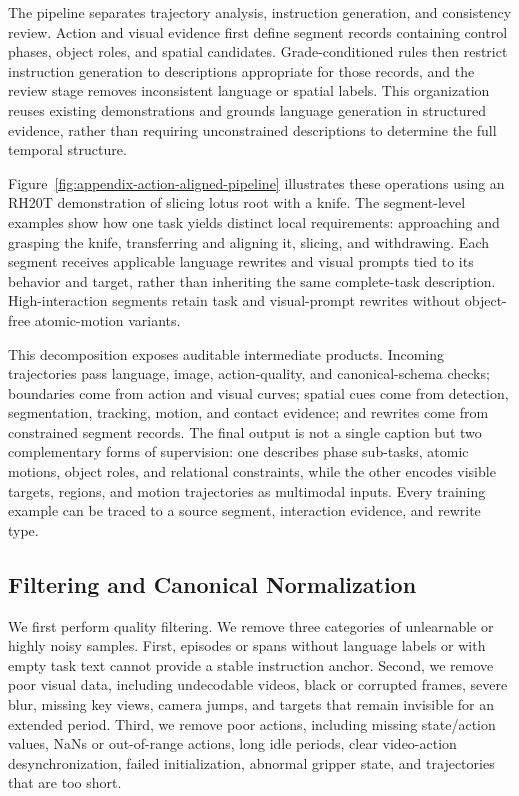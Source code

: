 The pipeline separates trajectory analysis, instruction generation, and consistency review. Action
and visual evidence first define segment records containing control phases, object roles, and
spatial candidates. Grade-conditioned rules then restrict instruction generation to descriptions
appropriate for those records, and the review stage removes inconsistent language or spatial labels.
This organization reuses existing demonstrations and grounds language generation in structured
evidence, rather than requiring unconstrained descriptions to determine the full temporal structure.

Figure~\ref{fig:appendix-action-aligned-pipeline} illustrates these operations
using an RH20T demonstration of slicing lotus root with a knife. The
segment-level examples show how one task yields distinct local requirements:
approaching and grasping the knife, transferring and aligning it, slicing,
and withdrawing. Each segment receives applicable language rewrites and
visual prompts tied to its behavior and target, rather than inheriting the
same complete-task description. High-interaction segments retain task and
visual-prompt rewrites without object-free atomic-motion variants.

%

%

This decomposition exposes auditable intermediate products. Incoming
trajectories pass language, image, action-quality, and canonical-schema
checks; boundaries come from action and visual curves; spatial cues come
from detection, segmentation, tracking, motion, and contact evidence;
and rewrites come from constrained segment records. The final output is
not a single caption but two complementary forms of supervision: one
describes phase sub-tasks, atomic motions, object roles, and relational
constraints, while the other encodes visible targets, regions, and
motion trajectories as multimodal inputs. Every training example can be
traced to a source segment, interaction evidence, and rewrite type.

\hypertarget{filtering-and-canonical-normalization}{%
\subsection{Filtering and Canonical
Normalization}\label{filtering-and-canonical-normalization}}

We first perform quality filtering. We remove three categories of
unlearnable or highly noisy samples. First, episodes or spans without
language labels or with empty task text cannot provide a stable
instruction anchor. Second, we remove poor visual data, including
undecodable videos, black or corrupted frames, severe blur, missing key
views, camera jumps, and targets that remain invisible for an extended
period. Third, we remove poor actions, including missing state/action
values, NaNs or out-of-range actions, long idle periods, clear
video-action desynchronization, failed initialization, abnormal gripper
state, and trajectories that are too short.

